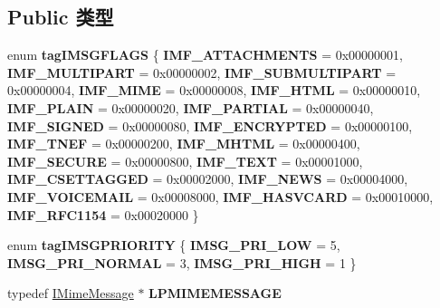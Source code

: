 \subsection*{Public 类型}
\begin{DoxyCompactItemize}
\item 
\mbox{\label{interface_m_i_m_e_o_l_e_1_1_i_mime_message_aee826d1e3f08b8a069d651c1f8fc94cf}} 
enum {\bfseries tag\+I\+M\+S\+G\+F\+L\+A\+GS} \{ \newline
{\bfseries I\+M\+F\+\_\+\+A\+T\+T\+A\+C\+H\+M\+E\+N\+TS} = 0x00000001, 
{\bfseries I\+M\+F\+\_\+\+M\+U\+L\+T\+I\+P\+A\+RT} = 0x00000002, 
{\bfseries I\+M\+F\+\_\+\+S\+U\+B\+M\+U\+L\+T\+I\+P\+A\+RT} = 0x00000004, 
{\bfseries I\+M\+F\+\_\+\+M\+I\+ME} = 0x00000008, 
\newline
{\bfseries I\+M\+F\+\_\+\+H\+T\+ML} = 0x00000010, 
{\bfseries I\+M\+F\+\_\+\+P\+L\+A\+IN} = 0x00000020, 
{\bfseries I\+M\+F\+\_\+\+P\+A\+R\+T\+I\+AL} = 0x00000040, 
{\bfseries I\+M\+F\+\_\+\+S\+I\+G\+N\+ED} = 0x00000080, 
\newline
{\bfseries I\+M\+F\+\_\+\+E\+N\+C\+R\+Y\+P\+T\+ED} = 0x00000100, 
{\bfseries I\+M\+F\+\_\+\+T\+N\+EF} = 0x00000200, 
{\bfseries I\+M\+F\+\_\+\+M\+H\+T\+ML} = 0x00000400, 
{\bfseries I\+M\+F\+\_\+\+S\+E\+C\+U\+RE} = 0x00000800, 
\newline
{\bfseries I\+M\+F\+\_\+\+T\+E\+XT} = 0x00001000, 
{\bfseries I\+M\+F\+\_\+\+C\+S\+E\+T\+T\+A\+G\+G\+ED} = 0x00002000, 
{\bfseries I\+M\+F\+\_\+\+N\+E\+WS} = 0x00004000, 
{\bfseries I\+M\+F\+\_\+\+V\+O\+I\+C\+E\+M\+A\+IL} = 0x00008000, 
\newline
{\bfseries I\+M\+F\+\_\+\+H\+A\+S\+V\+C\+A\+RD} = 0x00010000, 
{\bfseries I\+M\+F\+\_\+\+R\+F\+C1154} = 0x00020000
 \}
\item 
\mbox{\label{interface_m_i_m_e_o_l_e_1_1_i_mime_message_aacd70f98577d7ac02825e09bc698e5cd}} 
enum {\bfseries tag\+I\+M\+S\+G\+P\+R\+I\+O\+R\+I\+TY} \{ {\bfseries I\+M\+S\+G\+\_\+\+P\+R\+I\+\_\+\+L\+OW} = 5, 
{\bfseries I\+M\+S\+G\+\_\+\+P\+R\+I\+\_\+\+N\+O\+R\+M\+AL} = 3, 
{\bfseries I\+M\+S\+G\+\_\+\+P\+R\+I\+\_\+\+H\+I\+GH} = 1
 \}
\item 
\mbox{\label{interface_m_i_m_e_o_l_e_1_1_i_mime_message_a80e72b712727ea361a5632c293eeddd4}} 
typedef \hyperlink{interface_m_i_m_e_o_l_e_1_1_i_mime_message}{I\+Mime\+Message} $\ast$ {\bfseries L\+P\+M\+I\+M\+E\+M\+E\+S\+S\+A\+GE}

\end{DoxyCompactItemize}
